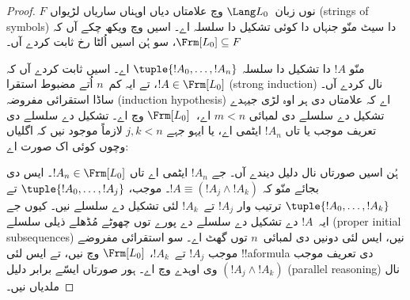 \documentclass[../../../include/open-logic-section]{subfiles}
\begin{document}
\begin{proof}
$F$ نوں زبان~$\Lang L_0$ وچ علامتاں دیاں اوہناں ساریاں لڑیواں (strings
of symbols) دا سیٹ منّو جنہاں دا کوئی تشکیل دا سلسلہ اے۔ اسیں
 وچ ویکھ چکے آں کہ
$\Frm[L_0] \subseteq F$، سو ہُن اسیں اُلٹا رخ ثابت کردے آں۔

منّو $!A$ دا تشکیل دا سلسلہ $\tuple{!A_0,\dotsc,!A_n}$ اے۔ اسیں ثابت
کردے آں کہ $!A \in \Frm[L_0]$، تے ایہ کم~$n$ اُتے مضبوط استقرا
(strong induction) نال کردے آں۔ ساڈا استقرائی مفروضہ (induction
hypothesis) اے کہ علامتاں دی ہر اوہ لڑی جیہدے تشکیل دے سلسلے دی
لمبائی $m < n$ اے،~$\Frm[L_0]$ وچ اے۔ تشکیل دے سلسلے دی تعریف موجب
یا تاں $!A_n$ ایٹمی اے، یا ایہو جہے $j,k < n$ لازماً موجود نیں کہ
اگلیاں وچوں کوئی اک صورت اے:
\begin{enumerate}
\end{enumerate}
ہُن اسیں صورتاں نال دلیل دیندے آں۔ جے $!A_n$ ایٹمی اے تاں
$!A_n \in \Frm[L_0]$۔ ایس دی بجائے منّو کہ $!A \equiv
(!A_j \land !A_k)$۔  موجب،
$\tuple{!A_0,\dotsc,!A_j}$ تے $\tuple{!A_0,\dotsc,!A_k}$ ترتیب وار
$!A_j$ تے~$!A_k$ لئی تشکیل دے سلسلے نیں۔ کیوں جے ایہ~$!A$ دے تشکیل دے
سلسلے دے پورے توں چھوٹے مُڈھلے ذیلی سلسلے (proper initial
subsequences) نیں، ایس لئی دونیں دی
لمبائی~$n$ توں گھٹ اے۔ سو استقرائی مفروضے موجب $!A_j$ تے~$!A_k$،
$\Frm[L_0]$ وچ نیں، تے ایس لئی !!a{formula} دی تعریف موجب
$(!A_j \land !A_k)$ وی اوہدے وچ اے۔ ہور صورتاں ایسّے برابر دلیل
(parallel reasoning) نال ملدیاں نیں۔
\end{proof}
\end{document}

